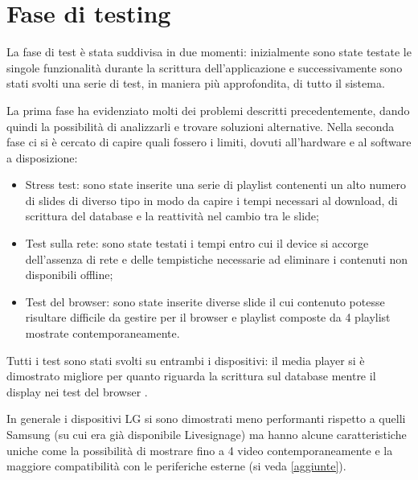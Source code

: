 \section{Fase di testing}

La fase di test è stata suddivisa in due momenti: inizialmente sono state testate le singole funzionalità durante la scrittura dell'applicazione e successivamente sono stati svolti una serie di test, in maniera più approfondita, di tutto il sistema.

La prima fase ha evidenziato molti dei problemi descritti precedentemente, dando quindi la possibilità di analizzarli e trovare soluzioni alternative.
Nella seconda fase ci si è cercato di capire quali fossero i limiti, dovuti all'hardware e al software a disposizione:
\begin{itemize}
    \item Stress test: sono state inserite una serie di playlist contenenti un alto numero di slides di diverso tipo in modo da capire i tempi necessari al download, di scrittura del database e la reattività nel cambio tra le slide;
    \item Test sulla rete: sono state testati i tempi entro cui il device si accorge dell'assenza di rete e delle tempistiche necessarie ad eliminare i contenuti non disponibili offline;
    \item Test del browser: sono state inserite diverse slide il cui contenuto potesse risultare difficile da gestire per il browser e playlist composte da 4 playlist mostrate contemporaneamente.
\end{itemize}

Tutti i test sono stati svolti su entrambi i dispositivi: il media player si è dimostrato migliore per quanto riguarda la scrittura sul database mentre il display nei test del browser .

In generale i dispositivi LG si sono dimostrati meno performanti rispetto a quelli Samsung (su cui era già disponibile Livesignage) ma hanno alcune caratteristiche uniche come la possibilità di mostrare fino a 4 video contemporaneamente e la maggiore compatibilità con le periferiche esterne (si veda \ref*{aggiunte}).